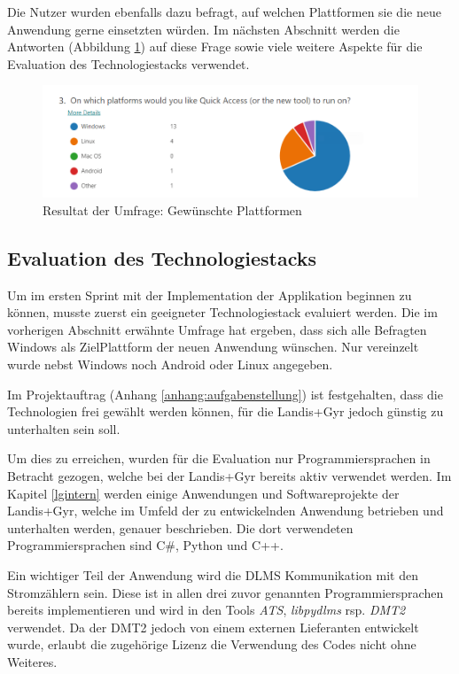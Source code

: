 Die Nutzer wurden ebenfalls dazu befragt, auf welchen Plattformen sie die neue Anwendung gerne einsetzten würden.
Im nächsten Abschnitt werden die Antworten (Abbildung \ref{fig:SurveryPlattforms}) auf diese Frage sowie viele weitere Aspekte für die Evaluation des Technologiestacks verwendet.

\begin{figure}[H]
   \centering
   \includegraphics[width=1.0\textwidth]{gfx/S0_Survey_Platform.png}
   \caption{
       Resultat der Umfrage: Gewünschte Plattformen
   }
   \label{fig:SurveryPlattforms}
\end{figure}

\subsection{Evaluation des Technologiestacks}
Um im ersten Sprint mit der Implementation der Applikation beginnen zu können, musste zuerst ein geeigneter Technologiestack evaluiert werden.
Die im vorherigen Abschnitt erwähnte Umfrage hat ergeben, dass sich alle Befragten Windows als ZielPlattform der neuen Anwendung wünschen.
Nur vereinzelt wurde nebst Windows noch Android oder Linux angegeben.

Im Projektauftrag (Anhang \ref{anhang:aufgabenstellung}) ist festgehalten, dass die Technologien frei gewählt werden können, für die Landis+Gyr jedoch günstig zu unterhalten sein soll.

Um dies zu erreichen, wurden für die Evaluation nur Programmiersprachen in Betracht gezogen, welche bei der Landis+Gyr bereits aktiv verwendet werden.
Im Kapitel \ref{lgintern} werden einige Anwendungen und Softwareprojekte der Landis+Gyr, welche im Umfeld der zu entwickelnden Anwendung betrieben und unterhalten werden, genauer beschrieben.
Die dort verwendeten Programmiersprachen sind C\#, Python und C++.


Ein wichtiger Teil der Anwendung wird die \ac{DLMS} Kommunikation mit den Stromzählern sein.
Diese ist in allen drei zuvor genannten Programmiersprachen bereits implementieren und wird in den Tools \textit{\ac{ATS}}, \textit{libpydlms} rsp. \textit{\ac{DMT2}} verwendet.
Da der \ac{DMT2} jedoch von einem externen Lieferanten entwickelt wurde, erlaubt die zugehörige Lizenz die Verwendung des Codes nicht ohne Weiteres.



